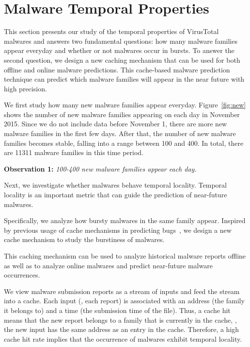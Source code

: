 \section{Malware Temporal Properties}
\label{sec:temporal}

This section presents our study of the temporal properties of VirusTotal malwares
and answers two fundamental questions: 
how many malware families appear everyday 
and whether or not malwares occur in bursts.
To answer the second question, we design a new caching mechanism 
that can be used for both offline and online malware predictions.
This cache-based malware prediction technique can predict which malware families will appear in the near 
future with high precision. 



We first study how many new malware families appear everyday. 
Figure~\ref{fig:new} shows the number of new malware families appearing on each day in November 2015. 
Since we do not include data before November 1, 
there are more new malware families in the first few days.
After that, the number of new malware families becomes stable, 
falling into a range between 100 and 400. 
In total, there are 11311 malware families in this time period. 

{\bf Observation 1:} 
{\em 100-400 new malware families appear each day.}




Next, we investigate whether malwares behave temporal locality.
Temporal locality is an important metric that can guide the 
prediction of near-future malwares.

Specifically, we analyze how bursty malwares in the same family appear.  
Inspired by previous usage of cache mechanisms in predicting bugs~\cite{predicting},
we design a new cache mechanism to study the burstiness of malwares.

This caching mechanism can be used to analyze historical malware reports offline 
as well as to analyze online malwares and predict near-future malware occurrences.

We view malware submission reports as a stream of inputs 
and feed the stream into a cache. 
Each input (\ie, each report) is associated with an address (the family it belongs to) and a time (the submission time of the file).
Thus, a cache hit means that the new report belongs to a family that is currently in the cache,
\ie, the new input has the same address as an entry in the cache.
Therefore, a high cache hit rate implies that the occurrence of malwares exhibit temporal locality.

